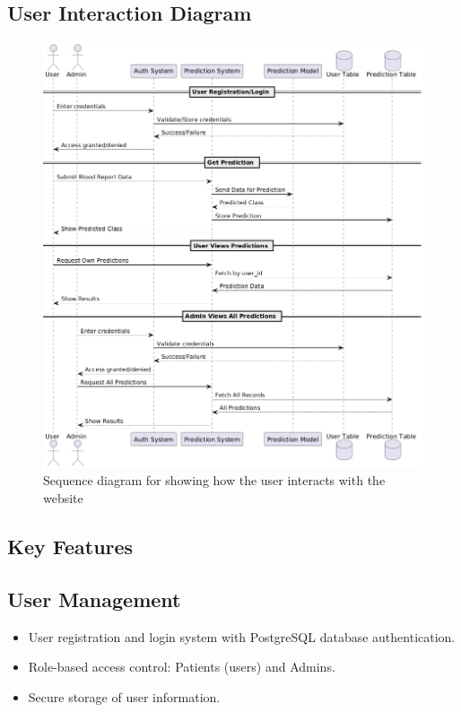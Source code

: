 \subsection{User Interaction Diagram}
\begin{figure}[htbp]
  \begin{center}
    \includegraphics[width=\textwidth]{figures/sequence-diagram.png}
  \end{center}
  \caption{Sequence diagram for showing how the user interacts with the website}\label{fig:sequence-diagram}
\end{figure}

\subsection{Key Features}
\subsection*{User Management}
\begin{itemize}
    \item User registration and login system with PostgreSQL database authentication.
    \item Role-based access control: Patients (users) and Admins.
    \item Secure storage of user information.
\end{itemize}

